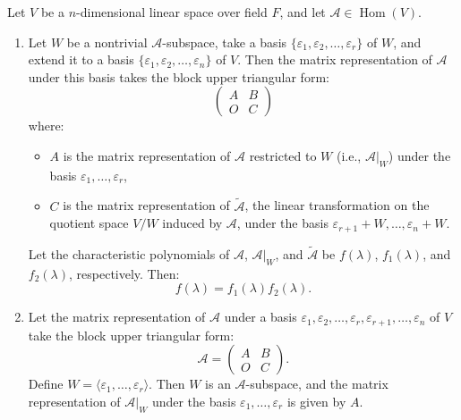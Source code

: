 \documentclass[11pt]{../../TexTemplate/elegantbook} %
\begin{document}
\begin{theorem}
    Let \( V \) be a \(n\)-dimensional linear space over field \( F \), and let \( \mathcal{A}\in \operatorname{Hom}(V) \).
    \begin{enumerate}
        \item Let \( W \) be a nontrivial \( \mathcal{A} \)-subspace,
            take a basis \( \{\varepsilon_1, \varepsilon_2, \dots, \varepsilon_r\} \) of \( W \),
            and extend it to a basis \( \{\varepsilon_1, \varepsilon_2, \dots, \varepsilon_n\} \) of \( V \).
            Then the matrix representation of \( \mathcal{A} \) under this basis takes the block upper triangular form:
            \[
            \begin{pmatrix}
                A & B \\
                O & C
            \end{pmatrix}
            \]
            where:
            \begin{itemize}
                \item \( A \) is the matrix representation of \( \mathcal{A} \) restricted to \( W \) (i.e., \( \mathcal{A}|_W \)) 
                    under the basis \(\varepsilon_1, \dots, \varepsilon_r\),
                \item \( C \) is the matrix representation of \( \widetilde{\mathcal{A}} \), 
                    the linear transformation on the quotient space \( V/W \) induced by \( \mathcal{A} \), 
                    under the basis \(\varepsilon_{r+1} + W, \dots, \varepsilon_n + W\).
            \end{itemize}
            Let the characteristic polynomials of \( \mathcal{A} \), \( \mathcal{A}|_W \), and \( \widetilde{\mathcal{A}} \) 
            be \( f(\lambda) \), \( f_1(\lambda) \), and \( f_2(\lambda) \), respectively. Then:
            \[ 
            f(\lambda) = f_1(\lambda) f_2(\lambda).
            \]
    
        \item Let the matrix representation of \( \mathcal{A} \) under a basis 
            \(\varepsilon_1, \varepsilon_2, \dots, \varepsilon_r, \varepsilon_{r+1}, \dots, \varepsilon_n\) 
            of \( V \) take the block upper triangular form:
            \[
            \mathcal{A} = 
            \begin{pmatrix}
            A & B \\
            O & C
            \end{pmatrix}.
            \]
            Define \( W = \langle \varepsilon_1, \dots, \varepsilon_r \rangle \). 
            Then \( W \) is an \( \mathcal{A} \)-subspace, 
            and the matrix representation of \( \mathcal{A}|_W \)
            under the basis \(\varepsilon_1, \dots, \varepsilon_r\) is given by \( A \).
        

\end{enumerate}
\end{theorem}
\end{document}
